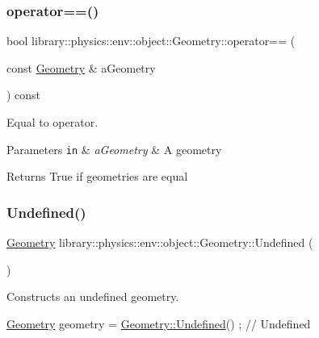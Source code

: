 \subsubsection{\texorpdfstring{operator==()}{operator==()}}
{\footnotesize\ttfamily bool library\+::physics\+::env\+::object\+::\+Geometry\+::operator== (\begin{DoxyParamCaption}\item[{const \hyperlink{classlibrary_1_1physics_1_1env_1_1object_1_1_geometry}{Geometry} \&}]{a\+Geometry }\end{DoxyParamCaption}) const}



Equal to operator. 


\begin{DoxyParams}[1]{Parameters}
\mbox{\tt in}  & {\em a\+Geometry} & A geometry \\
\hline
\end{DoxyParams}
\begin{DoxyReturn}{Returns}
True if geometries are equal 
\end{DoxyReturn}
\mbox{\label{classlibrary_1_1physics_1_1env_1_1object_1_1_geometry_a5e02f2d9a9a6ac2686f49780811d0fe2}} 
\subsubsection{\texorpdfstring{Undefined()}{Undefined()}}
{\footnotesize\ttfamily \hyperlink{classlibrary_1_1physics_1_1env_1_1object_1_1_geometry}{Geometry} library\+::physics\+::env\+::object\+::\+Geometry\+::\+Undefined (\begin{DoxyParamCaption}{ }\end{DoxyParamCaption})\hspace{0.3cm}{\ttfamily [static]}}



Constructs an undefined geometry. 


\begin{DoxyCode}
\hyperlink{classlibrary_1_1physics_1_1env_1_1object_1_1_geometry_a150ec4f85fe2c76471833df4145b96e8}{Geometry} geometry = \hyperlink{classlibrary_1_1physics_1_1env_1_1object_1_1_geometry_a5e02f2d9a9a6ac2686f49780811d0fe2}{Geometry::Undefined}() ; \textcolor{comment}{// Undefined}
\end{DoxyCode}


